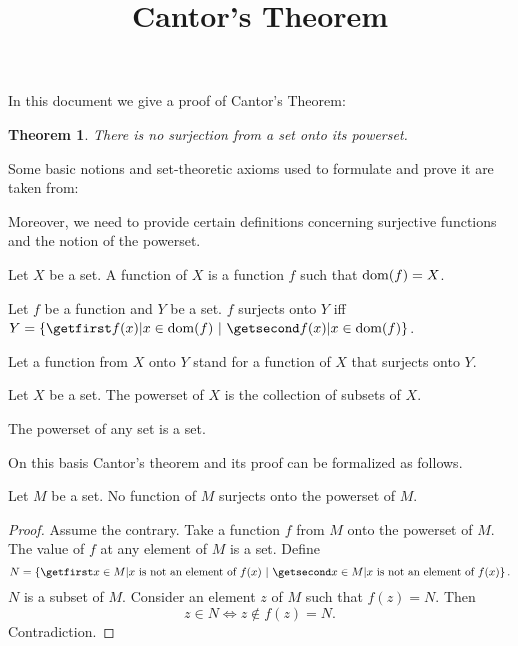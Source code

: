 \documentclass{article}
\title{Cantor's Theorem}
\author{}
\date{}
\newtheorem*{quotedtheorem}{Theorem}
\begin{document}

  \maketitle

  In this document we give a proof of Cantor's Theorem:

  \begin{quotedtheorem}
    There is no surjection from a set onto its powerset.
  \end{quotedtheorem}

  Some basic notions and set-theoretic axioms used to formulate and prove it are
  taken from:

  \begin{forthel}
  \end{forthel}

  Moreover, we need to provide certain definitions concerning surjective
  functions and the notion of the powerset.

  \begin{forthel}
    \begin{definition}
      Let $X$ be a set.
      A function of $X$ is a function $f$ such that $\operatorname{dom}(f) = X$.
    \end{definition}

    \begin{definition}
      Let $f$ be a function and $Y$ be a set.
      $f$ surjects onto $Y$ iff $Y = \class{f(x) | x \in \dom(f)}$.
    \end{definition}

    Let a function from $X$ onto $Y$ stand for a function of $X$ that surjects onto $Y$.

    \begin{definition}
      Let $X$ be a set.
      The powerset of $X$ is the collection of subsets of $X$.
    \end{definition}

    \begin{axiom}
      The powerset of any set is a set.
    \end{axiom}
  \end{forthel}

  On this basis Cantor's theorem and its proof can be formalized as follows.

  \begin{forthel}
    \begin{theorem}[Cantor]
      Let $M$ be a set.
      No function of $M$ surjects onto the powerset of $M$.
    \end{theorem}
    \begin{proof}
      Assume the contrary.
      Take a function $f$ from $M$ onto the powerset of $M$.
      The value of $f$ at any element of $M$ is a set.
      Define \[ N = \class{x \in M | \text{$x$ is not an element of $f(x)$}}. \]
      $N$ is a subset of $M$.
      Consider an element $z$ of $M$ such that $f(z) = N$.
      Then \[ z \in N \iff z \notin f(z) = N. \]
      Contradiction.
    \end{proof}
  \end{forthel}
\end{document}
